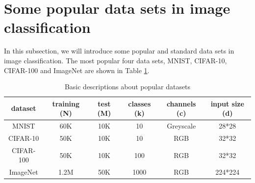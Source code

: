 {%
%



\break
\section{Some popular data sets in image classification}
In this subsection, we will introduce some popular and standard data sets
in image classification. The most popular four data sets, MNIST, CIFAR-10, CIFAR-100 and ImageNet are shown in Table \ref{popular_dataset}.

\begin{table}[H]
	\centering
	\begin{tabular}{|c|c|c|c|c|c|}
		\hline
		dataset &  training (N) & test (M)   & classes (k) & channels (c)& input size (d)\\\hline
		MNIST	&	60K	&	10K	&	10	& Greyscale & 28*28  \\\hline
		CIFAR-10	&	50K 	&	10K	&	10 & RGB & 32*32   \\\hline
		CIFAR-100	&	50K 	&	10K	&	100 & RGB & 32*32   \\\hline
		ImageNet	&	1.2M 	&	50K	&	1000 &	RGB & 224*224  \\\hline
	\end{tabular}
	\caption{Basic descriptions about popular datasets }
	\label{popular_dataset}
\end{table}

}
